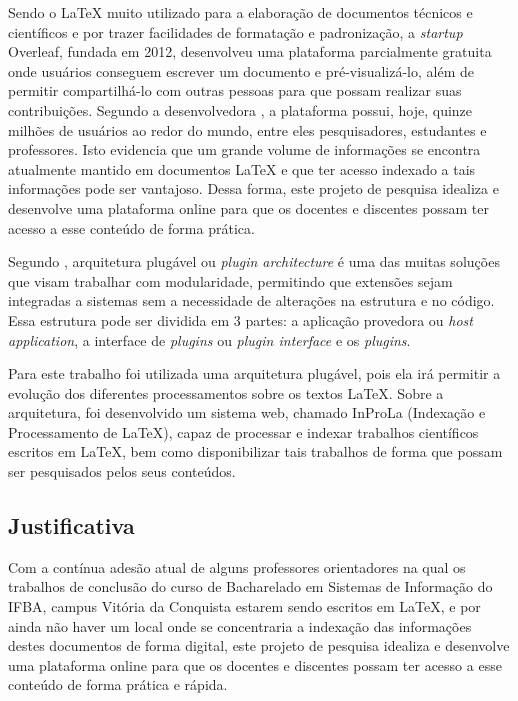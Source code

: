 \documentclass[12pt]{article}
\begin{document}
Sendo o LaTeX muito utilizado para a elaboração de documentos técnicos e científicos e por trazer facilidades de formatação e padronização, a \textit{startup} Overleaf, fundada em 2012, desenvolveu uma plataforma parcialmente gratuita onde usuários conseguem escrever um documento e pré-visualizá-lo,  além de permitir  compartilhá-lo com outras pessoas para que possam realizar suas contribuições. Segundo a desenvolvedora \cite{overleaf2012}, a plataforma possui, hoje, quinze milhões de usuários ao redor do mundo, entre eles pesquisadores, estudantes e professores. Isto evidencia que um grande volume de informações se encontra atualmente mantido em documentos LaTeX e que ter acesso indexado a tais informações pode ser vantajoso. Dessa forma, este projeto de pesquisa idealiza e desenvolve uma plataforma online para que os docentes e discentes possam ter acesso a esse conteúdo de forma prática.

Segundo \cite{cosentino2023}, arquitetura plugável ou \textit{plugin architecture} é uma das muitas soluções que visam trabalhar com modularidade, permitindo que extensões sejam integradas a sistemas sem a necessidade de alterações na estrutura e no código. Essa estrutura pode ser dividida em 3 partes: a aplicação provedora ou \textit{host application}, a interface de \textit{plugins} ou \textit{plugin interface} e os \textit{plugins}.

Para este trabalho foi utilizada uma arquitetura plugável, pois ela irá permitir a evolução dos diferentes processamentos sobre os textos LaTeX. Sobre a arquitetura, foi desenvolvido um sistema web, chamado InProLa (Indexação e Processamento de LaTeX), capaz de processar e indexar trabalhos científicos escritos em LaTeX, bem como disponibilizar tais trabalhos de forma que possam ser pesquisados pelos seus conteúdos.

\subsection{Justificativa}
Com a contínua adesão atual de alguns professores orientadores na qual os trabalhos de conclusão do curso de Bacharelado em Sistemas de Informação do IFBA, campus Vitória da Conquista estarem sendo escritos em LaTeX, e por ainda não haver um local onde se concentraria a indexação das informações destes documentos de forma digital, este projeto de pesquisa idealiza e desenvolve uma plataforma online para que os docentes e discentes possam ter acesso a esse conteúdo de forma prática e rápida.
\end{document}
